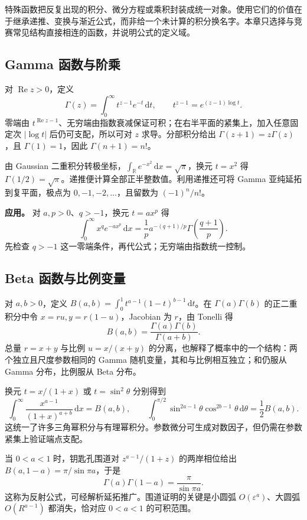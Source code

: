 \documentclass[12pt,fontset=fandol]{ctexart}
\begin{document}
特殊函数把反复出现的积分、微分方程或乘积封装成统一对象。使用它们的价值在于继承递推、变换与渐近公式，而非给一个未计算的积分换名字。本章只选择与竞赛常见结构直接相连的函数，并说明公式的定义域。

\subsection{Gamma 函数与阶乘}

\label{app:special-gamma}

对 $\operatorname{Re}z>0$，定义
\[
\Gamma(z)=\int_0^\infty t^{z-1}e^{-t}\,\mathrm dt,
\qquad t^{z-1}=e^{(z-1)\log t}.
\]
零端由 $t^{\operatorname{Re}z-1}$、无穷端由指数衰减保证可积；在右半平面的紧集上，加入任意固定次 $|\log t|$ 后仍可支配，所以可对 $z$ 求导。分部积分给出 $\Gamma(z+1)=z\Gamma(z)$，且 $\Gamma(1)=1$，因此 $\Gamma(n+1)=n!$。

由 Gaussian 二重积分转极坐标，$\int_{\mathbb R}e^{-x^2}\,\mathrm dx=\sqrt\pi$，换元 $t=x^2$ 得 $\Gamma(1/2)=\sqrt\pi$。递推便计算全部正半整数值。利用递推还可将 Gamma 亚纯延拓到复平面，极点为 $0,-1,-2,\ldots$，且留数为 $(-1)^n/n!$。

\textbf{应用。} 对 $a,p>0$、$q>-1$，换元 $t=ax^p$ 得
\[
\int_0^\infty x^qe^{-ax^p}\,\mathrm dx
=\frac1p a^{-(q+1)/p}\Gamma\!\left(\frac{q+1}{p}\right).
\]
先检查 $q>-1$ 这一零端条件，再代公式；无穷端由指数统一控制。

\subsection{Beta 函数与比例变量}

\label{app:special-beta}

对 $a,b>0$，定义 $B(a,b)=\int_0^1t^{a-1}(1-t)^{b-1}\,\mathrm dt$。在 $\Gamma(a)\Gamma(b)$ 的正二重积分中令 $x=ru,y=r(1-u)$，Jacobian 为 $r$，由 Tonelli 得
\[
B(a,b)=\frac{\Gamma(a)\Gamma(b)}{\Gamma(a+b)}.
\]
总量 $r=x+y$ 与比例 $u=x/(x+y)$ 的分离，也解释了概率中的一个结构：两个独立且尺度参数相同的 Gamma 随机变量，其和与比例相互独立；和仍服从 Gamma 分布，比例服从 Beta 分布。

换元 $t=x/(1+x)$ 或 $t=\sin^2\theta$ 分别得到
\[
\int_0^\infty\frac{x^{a-1}}{(1+x)^{a+b}}\,\mathrm dx=B(a,b),
\qquad
\int_0^{\pi/2}\sin^{2a-1}\theta\cos^{2b-1}\theta\,\mathrm d\theta=\frac12B(a,b).
\]
这统一了许多三角幂积分与有理幂积分。参数微分可生成对数因子，但仍需在参数紧集上验证端点支配。

当 $0<a<1$ 时，钥匙孔围道对 $z^{a-1}/(1+z)$ 的两岸相位给出 $B(a,1-a)=\pi/\sin\pi a$，于是
\[
\Gamma(a)\Gamma(1-a)=\frac\pi{\sin\pi a}.
\]
这称为反射公式，可经解析延拓推广。围道证明的关键是小圆弧 $O(\varepsilon^a)$、大圆弧 $O(R^{a-1})$ 都消失，恰对应 $0<a<1$ 的可积范围。
\end{document}
